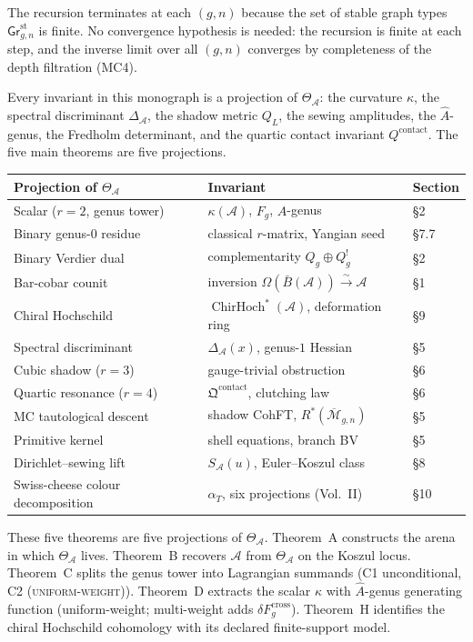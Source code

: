 \documentclass[11pt,reqno]{amsart}
\theoremstyle{definition}
\theoremstyle{remark}
\providecommand{\cA}{\mathcal{A}}
\providecommand{\cM}{\mathcal{M}}
\providecommand{\barB}{\bar{B}}
\numberwithin{equation}{section}
\begin{document}
The recursion terminates at each $(g,n)$ because the set of stable
graph types $\mathsf{Gr}^{\mathrm{st}}_{g,n}$ is finite. No
convergence hypothesis is needed: the recursion is finite at each step,
and the inverse limit over all $(g,n)$ converges by completeness of
the depth filtration (MC4).

\bigskip
\noindent
Every invariant in this monograph is a projection of $\Theta_\cA$:
the curvature $\kappa$, the spectral discriminant $\Delta_\cA$, the
shadow metric $Q_L$, the sewing amplitudes, the $\hat A$-genus, the
Fredholm determinant, and the quartic contact invariant
$Q^{\mathrm{contact}}$. The five main theorems are five projections.

\medskip
\begin{center}
\small
\renewcommand{\arraystretch}{1.15}
\begin{tabular}{lll}
\textbf{Projection of $\Theta_\cA$} & \textbf{Invariant} & \textbf{Section}\\
\hline
Scalar ($r=2$, genus tower) & $\kappa(\cA)$, $F_g$, $\hat A$-genus & \S2\\[1pt]
Binary genus-$0$ residue & classical $r$-matrix, Yangian seed & \S7.7\\[1pt]
Binary Verdier dual & complementarity $Q_g\oplus Q_g^!$ & \S2\\[1pt]
Bar-cobar counit & inversion $\Omega(\barB(\cA))\xrightarrow{\sim}\cA$ & \S1\\[1pt]
Chiral Hochschild & $\operatorname{ChirHoch}^*(\cA)$, deformation ring & \S9\\[1pt]
Spectral discriminant & $\Delta_\cA(x)$, genus-$1$ Hessian & \S5\\[1pt]
Cubic shadow ($r=3$) & gauge-trivial obstruction & \S6\\[1pt]
Quartic resonance ($r=4$) & $\mathfrak Q^{\mathrm{contact}}$, clutching law & \S6\\[1pt]
MC tautological descent & shadow CohFT, $R^*(\overline{\cM}_{g,n})$ & \S5\\[1pt]
Primitive kernel & shell equations, branch BV & \S5\\[1pt]
Dirichlet--sewing lift & $S_\cA(u)$, Euler--Koszul class & \S8\\[1pt]
Swiss-cheese colour decomposition & $\alpha_T$, six projections (Vol.~II) & \S10
\end{tabular}
\end{center}
\medskip

\noindent
These five theorems are five projections of $\Theta_\cA$. Theorem~A
constructs the arena in which $\Theta_\cA$ lives. Theorem~B
recovers $\cA$ from $\Theta_\cA$ on the Koszul locus. Theorem~C
splits the genus tower into Lagrangian summands (C1 unconditional, C2
\textsc{(uniform-weight)}). Theorem~D extracts the scalar $\kappa$
with $\hat A$-genus generating function (uniform-weight; multi-weight
adds $\delta F_g^{\mathrm{cross}}$). Theorem~H identifies the
chiral Hochschild cohomology with its declared finite-support model.
\end{document}
